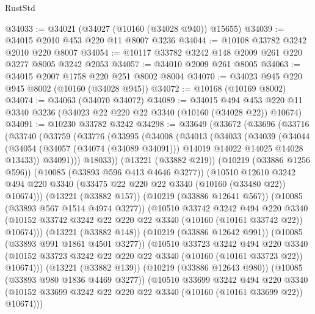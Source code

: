 \begin{lexlean}{RustStd}
\begin{coremodule}
@34033 := @34021 (@34027 (@10160 (@34028 @940)) @15655)
@34039 := @34015 @2010 @453 @220 @11 @8007 @3236
@34044 := @10108 @33782 @3242 @2010 @220 @8007
@34054 := @10117 @33782 @3242 @148 @2009 @261 @220 @3277 @8005 @3242 @2053
@34057 := @34010 @2009 @261 @8005
@34063 := @34015 @2007 @1758 @220 @251 @8002 @8004
@34070 := @34023 @945 @220 @945 @8002 (@10160 (@34028 @945))
@34072 := @10168 (@10169 @8002)
@34074 := @34063 (@34070 @34072)
@34089 := @34015
    @494
    @453
    @220
    @11
    @3340
    @3236
    (@34023 @22 @220 @22 @3340 (@10160 (@34028 @22)) @10674)
@34091 := @10230 @33782 @3242
@34298 := @33649
    (@33672
      (@33696
        (@33716
          (@33740
            (@33759
              (@33776
                (@33995
                  (@34008
                    (@34013
                      (@34033
                        (@34039
                          (@34044
                            (@34054
                              (@34057 (@34074 (@34089 @34091)))
                              @14019
                              @14022
                              @14025
                              @14028
                              @13433))
                          @34091)))
                    @18033))
                (@13221 (@33882 @219))
                (@10219 (@33886 @1256 @596))
                (@10085 (@33893 @596 @413 @4646 @3277))
                (@10510
                  @12610
                  @3242
                  @494
                  @220
                  @3340
                  (@33475 @22 @220 @22 @3340 (@10160 (@33480 @22)) @10674)))
              (@13221 (@33882 @157))
              (@10219 (@33886 @12641 @567))
              (@10085 (@33893 @567 @1514 @4974 @3277))
              (@10510
                @33742
                @3242
                @494
                @220
                @3340
                (@10152 @33742 @3242 @22 @220 @22 @3340 (@10160 (@10161 @33742 @22)) @10674)))
            (@13221 (@33882 @148))
            (@10219 (@33886 @12642 @991))
            (@10085 (@33893 @991 @1861 @4501 @3277))
            (@10510
              @33723
              @3242
              @494
              @220
              @3340
              (@10152 @33723 @3242 @22 @220 @22 @3340 (@10160 (@10161 @33723 @22)) @10674)))
          (@13221 (@33882 @139))
          (@10219 (@33886 @12643 @980))
          (@10085 (@33893 @980 @1836 @4469 @3277))
          (@10510
            @33699
            @3242
            @494
            @220
            @3340
            (@10152 @33699 @3242 @22 @220 @22 @3340 (@10160 (@10161 @33699 @22)) @10674)))

\end{coremodule}
\end{lexlean}
